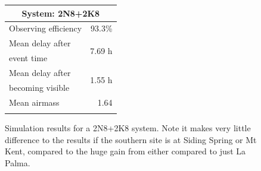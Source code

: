 \begin{colsection}
\begin{colsection}
\begin{figure}[p]
\begin{center}
    \begin{minipage}[t]{0.35\textwidth}\vspace{0pt}
    \begin{tabular}{lr}
    \multicolumn{2}{c}{\textbf{System: 2N8+2K8}} \\
    \midrule
    Observing efficiency & 93.3\% \\
    \midrule
    Mean delay after     & \multirow{2}{*}{7.69 h} \\
    event time           & \\
    Mean delay after     & \multirow{2}{*}{1.55 h} \\
    becoming visible     & \\
    \midrule
    Mean airmass         & 1.64 \\
    & \\
    \end{tabular}
    \vfill
    \end{minipage}

    \end{center}
    \caption[GW simulation results: 2N8+2K8 system]{
        Simulation results for a 2N8+2K8 system. Note it makes very little difference to the results if the southern site is at Siding Spring or Mt Kent, compared to the huge gain from either compared to just La Palma.
    }\label{fig:gw_sim_2n8+2k8}
\end{figure}


\clearpage

\begin{table}[t]
    \begin{center}
    \begin{tabular}{c|cccc|c|cc|c} %


\end{tabular}
\end{center}
\end{table}
\end{colsection}
\end{colsection}
